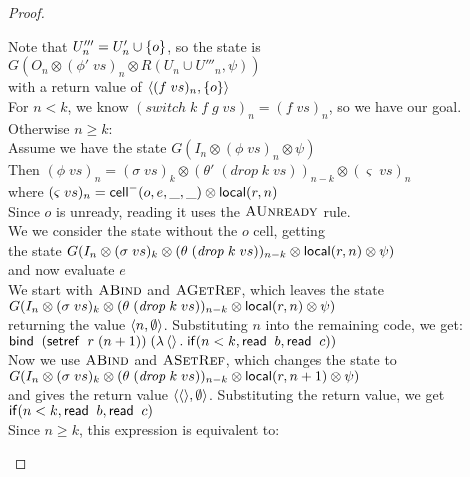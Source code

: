 \begin{proof}
\begin{enumerate}
\begin{tabbedproof}
  \oooo Note that $U'''_n = U'_n \cup \{{o}\}$, so the state is \\
  \ooooo $G(O_n \otimes (\phi'\;vs)_n \otimes R(U_n \cup U'''_n, \psi))$ \\ 
  \oooo with a return value of $\left<{(f\;vs)_n},{\{{o}\}}\right>$ \\ 
  \oooo For $n < k$, we know $(\mathit{switch}\;k\;f\;g\;vs)_n = (f\;vs)_n$, so we have our goal. \\
  \ooo Otherwise $n \geq k$: \\
  \oooo Assume we have the state $G(I_n \otimes (\phi\;vs)_n \otimes \psi)$ \\
  \oooo Then $(\phi\;vs)_n = (\sigma\;vs)_k \otimes (\theta'\;(\mathit{drop}\;k\;vs))_{n-k} \otimes (\varsigma\;vs)_n$ \\
  \oooo where $(\varsigma\;vs)_n = \mathsf{cell}^{-}({o}, {e}, {\_}, {\_}) \otimes \mathsf{local}({r}, {n})$ \\
  \oooo Since $o$ is unready, reading it uses the $\textsc{AUnready}$ rule. \\
  \oooo We we consider the state without the $o$ cell, getting \\
  \oooo the state $G(I_n \otimes (\sigma\;vs)_k \otimes (\theta\;(\mathit{drop}\;k\;vs))_{n-k} \otimes \mathsf{local}({r}, {n}) \otimes \psi)$ \\ 
  \oooo and now evaluate $e$ \\ 
  \oooo We start with $\textsc{ABind}$ and $\textsc{AGetRef}$, which leaves the state \\
  \ooooo $G(I_n \otimes (\sigma\;vs)_k \otimes (\theta\;(\mathit{drop}\;k\;vs))_{n-k} \otimes \mathsf{local}({r}, {n}) \otimes \psi)$ \\ 
  \oooo returning the value $\left<{n},{\emptyset}\right>$. Substituting $n$ into the remaining code, we get: \\
  \ooooo $\mathsf{bind}\;\;(\mathsf{setref}\;\;r\;(n+1))\; (\lambda \left<\right>.\;\mathsf{if}({n < k}, {\mathsf{read}\;\;b}, {\mathsf{read}\;\;c}))$ \\
  \oooo Now we use $\textsc{ABind}$ and $\textsc{ASetRef}$, which changes the state to \\
  \ooooo $G(I_n \otimes (\sigma\;vs)_k \otimes (\theta\;(\mathit{drop}\;k\;vs))_{n-k} \otimes \mathsf{local}({r}, {n+1}) \otimes \psi)$ \\ 
  \oooo and gives the return value $\left<{\left<\right>},{\emptyset}\right>$. Substituting the return value, we get \\
  \ooooo $\mathsf{if}({n < k}, {\mathsf{read}\;\;b}, {\mathsf{read}\;\;c})$ \\
  \oooo Since $n \geq k$, this expression is equivalent to: \\

\end{tabbedproof}
\end{enumerate}
\end{proof}
